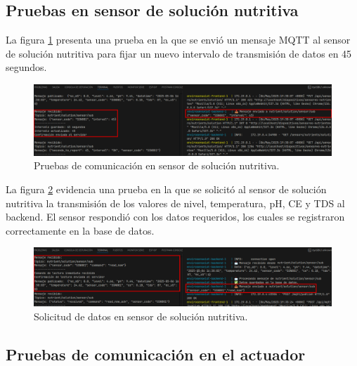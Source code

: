\subsection{Pruebas en sensor de solución nutritiva}

La figura \ref{fig:prueba_mqtt_sensor_solucion_nutritiva_1} presenta una prueba
en la que se envió un mensaje MQTT al sensor de solución nutritiva para fijar
un nuevo intervalo de transmisión de datos en 45 segundos.

\begin{figure}[H]
    \centering
    \includegraphics[width=\textwidth]{Images/57_prueba_mqtt_sensor_solucion_nutritiva_1.png}
    \caption[Pruebas de comunicación en sensor de solución nutritiva]{Pruebas de comunicación en sensor de solución nutritiva.}
    \label{fig:prueba_mqtt_sensor_solucion_nutritiva_1}
\end{figure}

La figura \ref{fig:prueba_mqtt_sensor_solucion_nutritiva_2} evidencia una
prueba en la que se solicitó al sensor de solución nutritiva la transmisión de
los valores de nivel, temperatura, pH, CE y TDS al backend. El sensor respondió
con los datos requeridos, los cuales se registraron correctamente en la base de
datos.

\begin{figure}[H]
    \centering
    \includegraphics[width=\textwidth]{Images/57_prueba_mqtt_sensor_solucion_nutritiva_2.png}
    \caption[Solicitud de datos en sensor de solución nutritiva]{Solicitud de datos en sensor de solución nutritiva.}
    \label{fig:prueba_mqtt_sensor_solucion_nutritiva_2}
\end{figure}

\subsection{Pruebas de comunicación en el actuador}


